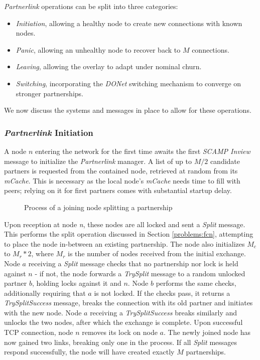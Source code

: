 \documentclass[12pt,a4paper]{article}
\begin{document}
\textit{Partnerlink} operations can be split into three categories:
\begin{itemize}
	\item \textit{Initiation}, allowing a healthy node to create new connections with known nodes.
	\item \textit{Panic}, allowing an unhealthy node to recover back to \(M\) connections.
	\item \textit{Leaving}, allowing the overlay to adapt under nominal churn.
	\item \textit{Switching}, incorporating the \textit{DONet} switching mechanism to converge on stronger partnerships.
\end{itemize}
We now discuss the systems and messages in place to allow for these operations.

\subsubsection{\textit{Partnerlink} Initiation} \label{css:partnerlink:initiation}
A node \(n\) entering the network for the first time awaits the first \textit{SCAMP Inview} message to initialize the \textit{Partnerlink} manager. A list of up to \(M / 2\) candidate partners is requested from the contained node, retrieved at random from its \textit{mCache}. This is necessary as the local node's \textit{mCache} needs time to fill with peers; relying on it for first partners comes with substantial startup delay.

\begin{figure}[!ht]
	\centering
	\resizebox{0.8\textwidth}{!}{%
		
	}%
\caption{Process of a joining node splitting a partnership}
\label{split}
\end{figure}


Upon reception at node \textit{n}, these nodes are all locked and sent a \textit{Split} message. This performs the split operation discussed in Section \ref{problems:fcn}, attempting to place the node in-between an existing partnership. The node also initializes \(M_c\) to \(M_r * 2\), where \(M_r\) is the number of nodes received from the initial exchange. Node \(a\) receiving a \textit{Split} message checks that no partnership nor lock is held against \(n\) - if not, the node forwards a \textit{TrySplit} message to a random unlocked partner \(b\), holding locks against it and \(n\). Node \(b\) performs the same checks, additionally requiring that \(a\) is not locked. If the checks pass, it returns a \textit{TrySplitSuccess} message, breaks the connection with its old partner and initiates with the new node. Node \(a\) receiving a \textit{TrySplitSuccess} breaks similarly and unlocks the two nodes, after which the exchange is complete. Upon successful TCP connection, node \(n\) removes its lock on node \(a\). The newly joined node has now gained two links, breaking only one in the process. If all \textit{Split} messages respond successfully, the node will have created exactly \(M\) partnerships.
\end{document}
